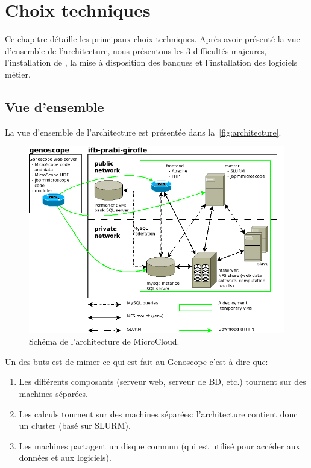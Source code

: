 \chapter{Choix techniques} \label{chap:choix_techniques}

Ce chapitre détaille les principaux choix techniques.
Après avoir présenté la vue d'ensemble de l'architecture, nous présentons les 3 difficultés majeures,
l'installation de , la mise à disposition des banques et
l'installation des logiciels métier.

\section{Vue d'ensemble}

La vue d'ensemble de l'architecture est présentée dans la~\autoref{fig:architecture}.

\begin{figure}[htp]
    \centering
    \includegraphics[width=\linewidth]{../Architecture}
    \caption{Schéma de l'architecture de MicroCloud.}
    \label{fig:architecture}
\end{figure}

Un des buts est de mimer ce qui est fait au Genoscope
c'est-à-dire que:
\begin{enumerate}
    \item Les différents composants (serveur web, serveur de BD, etc.) tournent sur des machines séparées.
    \item Les calculs tournent sur des machines séparées: l'architecture contient donc un cluster (basé sur SLURM).
    \item Les machines partagent un disque commun (qui est utilisé pour accéder aux données et aux logiciels).
\end{enumerate}\vspace*{\baselineskip}

